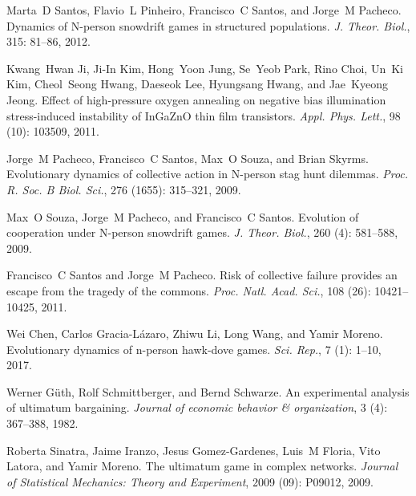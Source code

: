 Marta~D Santos, Flavio~L Pinheiro, Francisco~C Santos, and Jorge~M Pacheco.
\newblock Dynamics of {{N}}-person snowdrift games in structured populations.
\newblock \emph{J. Theor. Biol.}, 315: 81--86, 2012.

Kwang~Hwan Ji, Ji-In Kim, Hong~Yoon Jung, Se~Yeob Park, Rino Choi, Un~Ki Kim,
Cheol~Seong Hwang, Daeseok Lee, Hyungsang Hwang, and Jae~Kyeong Jeong.
\newblock Effect of high-pressure oxygen annealing on negative bias
illumination stress-induced instability of {{InGaZnO}} thin film transistors.
\newblock \emph{Appl. Phys. Lett.}, 98 (10): 103509, 2011.

Jorge~M Pacheco, Francisco~C Santos, Max~O Souza, and Brian Skyrms.
\newblock Evolutionary dynamics of collective action in {{N}}-person stag hunt
dilemmas.
\newblock \emph{Proc. R. Soc. B Biol. Sci.}, 276 (1655):
315--321, 2009.

Max~O Souza, Jorge~M Pacheco, and Francisco~C Santos.
\newblock Evolution of cooperation under {{N}}-person snowdrift games.
\newblock \emph{J. Theor. Biol.}, 260 (4): 581--588, 2009.

Francisco~C Santos and Jorge~M Pacheco.
\newblock Risk of collective failure provides an escape from the tragedy of the
commons.
\newblock \emph{Proc. Natl. Acad. Sci.}, 108 (26):
10421--10425, 2011.

Wei Chen, Carlos {Gracia-L{\'a}zaro}, Zhiwu Li, Long Wang, and Yamir Moreno.
\newblock Evolutionary dynamics of n-person hawk-dove games.
\newblock \emph{Sci. Rep.}, 7 (1): 1--10, 2017.

Werner G{\"u}th, Rolf Schmittberger, and Bernd Schwarze.
\newblock An experimental analysis of ultimatum bargaining.
\newblock \emph{Journal of economic behavior \& organization}, 3
(4): 367--388, 1982.

Roberta Sinatra, Jaime Iranzo, Jesus Gomez-Gardenes, Luis~M Floria, Vito
Latora, and Yamir Moreno.
\newblock The ultimatum game in complex networks.
\newblock \emph{Journal of Statistical Mechanics: Theory and Experiment},
2009 (09): P09012, 2009.

